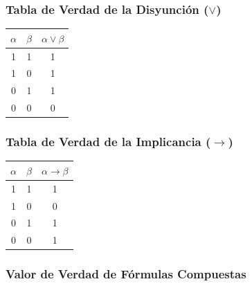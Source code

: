 
\subsubsection{Tabla de Verdad de la Disyunción ($\lor$)}

\begin{center}
    \begin{tabular}{|c|c||c|}
        \hline
        $\alpha$ & $\beta$ & $\alpha \lor \beta$ \\
        \hline
        1 & 1 & 1 \\
        \hline
        1 & 0 & 1 \\
        \hline
        0 & 1 & 1 \\
        \hline
        0 & 0 & 0 \\
        \hline
    \end{tabular}
\end{center}


\subsubsection{Tabla de Verdad de la Implicancia ($\rightarrow$)}

\begin{center}
    \begin{tabular}{|c|c||c|}
        \hline
        $\alpha$ & $\beta$ & $\alpha \rightarrow \beta$ \\
        \hline
        1 & 1 & 1 \\
        \hline
        1 & 0 & 0 \\
        \hline
        0 & 1 & 1 \\
        \hline
        0 & 0 & 1 \\
        \hline
    \end{tabular}
\end{center}


\subsubsection{Valor de Verdad de Fórmulas Compuestas}

